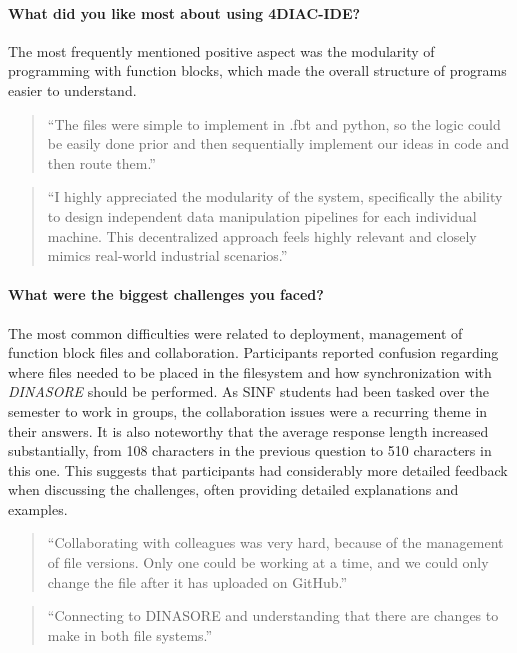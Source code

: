 \paragraph{What did you like most about using 4DIAC-IDE?}
The most frequently mentioned positive aspect was the modularity of programming with function blocks, which made the overall structure of programs easier to understand.

\begin{quote}
``The files were simple to implement in .fbt and python, so the logic could be easily done prior and then sequentially implement our ideas in code and then route them.''
\end{quote}

\begin{quote}
``I highly appreciated the modularity of the system, specifically the ability to design independent data manipulation pipelines for each individual machine. This decentralized approach feels highly relevant and closely mimics real-world industrial scenarios.''
\end{quote}

\paragraph{What were the biggest challenges you faced?}
The most common difficulties were related to deployment, management of function block files and collaboration. Participants reported confusion regarding where files needed to be placed in the filesystem and how synchronization with \textit{DINASORE} should be performed. As \ac{SINF} students had been tasked over the semester to work in groups, the collaboration issues were a recurring theme in their answers. It is also noteworthy that the average response length increased substantially, from 108 characters in the previous question to 510 characters in this one. This suggests that participants had considerably more detailed feedback when discussing the challenges, often providing detailed explanations and examples.

\begin{quote}
``Collaborating with colleagues was very hard, because of the management of file versions. Only one could be working at a time, and we could only change the file after it has uploaded on GitHub.''
\end{quote}

\begin{quote}
``Connecting to DINASORE and understanding that there are changes to make in both file systems.''
\end{quote}

